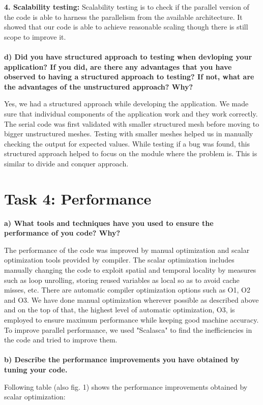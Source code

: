 \documentclass[a4paper, 11pt, oneside]{scrartcl}
\begin{document}
\textbf{4. Scalability testing:} 
Scalability testing is to check if the parallel version of the code is able to harness the parallelism from the available architecture. It showed that our code is able to achieve reasonable scaling though there is still scope to improve it.
\\
\\
\textbf{d) Did you have structured approach to testing when devloping your application? If you did, are there any advantages that you have observed to having a structured approach to testing? If not, what are the advantages of the unstructured approach? Why?}

Yes, we had a structured approach while developing the application. We made sure that individual components of the application work and they work correctly. The serial code was first validated with smaller structured mesh before moving to bigger unstructured meshes. Testing with smaller meshes helped us in manually checking the output for expected values. While testing if a bug was found, this structured approach helped to focus on the module where the problem is. This is similar to divide and conquer approach.
\section*{Task 4: Performance}
\textbf{a) What tools and techniques have you used to ensure the performance of you code? Why?}

The performance of the code was improved by manual optimization and scalar optimization tools provided by compiler. The scalar optimization includes manually changing the code to exploit spatial and temporal locality by measures such as loop unrolling, storing reused variables as local so as to avoid cache misses, etc. There are automatic compiler optimization options such as O1, O2 and O3. We have done manual optimization wherever possible as described above and on the top of that, the highest level of automatic optimization, O3, is employed to ensure maximum performance while keeping good machine accuracy. To improve parallel performance, we used "Scalasca" to find the inefficiencies in the code and tried to improve them.
\\
\\
\textbf{b) Describe the performance improvements you have obtained by tuning your code.}

Following table (also fig. 1) shows the performance improvements obtained by scalar optimization:
\end{document}

